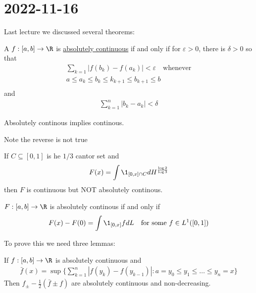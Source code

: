 \section{2022-11-16}

Last lecture we discussed several theorems:

\begin{theorem}
	A $f : [a,b] \to \R$  is \underline{absolutely continuous} if and only if for $\varepsilon > 0$, there is $\delta > 0$ so that
	\begin{align*}
		\sum_{k=1} | f (b_k) - f(a_k) | < \varepsilon \quad \text{whenever} \\
		a \leq a_k \leq b_k \leq k_{k+1} \leq b_{k+1} \leq b \\
	\end{align*} and
	\begin{align*}
		\sum_{k=1}^{n} | b_k - a_k | < \delta
	\end{align*} 
	
\end{theorem}

\begin{lemma}
	Absolutely continous implies continous.
\end{lemma}

Note the reverse is not true

\begin{example}
	If $C \subseteq [0,1]$ is he $1/3$ cantor set and 
	\begin{align*}
		F(x) = \int \1_{[0,x] \cap C} dH^{\frac{\log{2}}{\log{3}}}
	\end{align*} then $F$ is continuous but NOT absolutely continous.
\end{example}


\begin{theorem}
	$F : [a,b] \to \R$ is absolutely continous if and only if
	\begin{align*}
		F(x) - F(0) = \int \1_{[0,x]} f dL \quad \text{for some } f \in L^{1} ([0,1])
	\end{align*} 
\end{theorem}

To prove this we need three lemmas:

\begin{lemma}
	If $f : [a,b] \to \R$ is absolutely continuous and
	\begin{align*}
		\bar{f} (x) = \sup\{ \sum_{k=1}^{n} | f (y_k) - f (y_{k-1}) | : a = y_0 \leq y_1 \leq \ldots \leq y_n = x \}
	\end{align*} 
	Then $f_{\pm} - \frac{1}{2} (\bar{f} \pm f)$ are absolutely continuous and non-decreasing.
\end{lemma}

